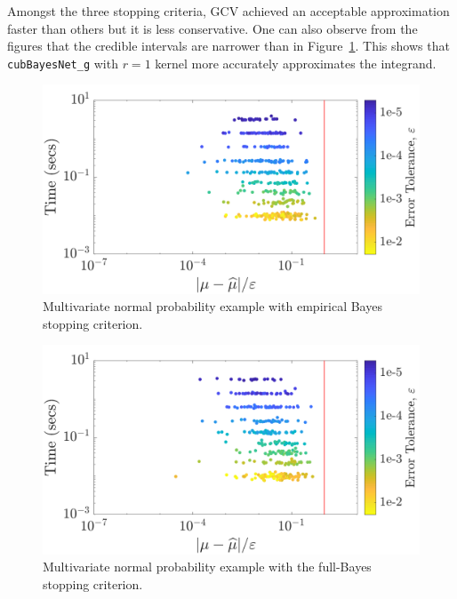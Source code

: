 \documentclass[graybox,footinfo]{svmult}
\newcommand{\code}[1]{\texttt{#1}}
\newcommand\figref{Figure~\ref}
\begin{document}
Amongst the three stopping criteria, GCV achieved an acceptable approximation faster than others but it is less conservative. 
One can also observe from the figures that the credible intervals are narrower than in \figref{fig:Sobol-mvn-guaranteed-MLE}.
This shows that \code{cubBayesNet\_g} with $r=1$ kernel more accurately approximates the integrand.

\begin{figure}
\centering
\includegraphics[width=0.95\linewidth]{"figures/Sobol/Sobol_MVN_guaranteed_time_MLE__d2_r1_2019-Sep-1"}
\caption[Sobol: MVN guaranteed: MLE]{Multivariate normal probability example with empirical Bayes stopping criterion.}
\label{fig:Sobol-mvn-guaranteed-MLE}
\end{figure}
\begin{figure}
\centering
\includegraphics[width=0.95\linewidth]{"figures/Sobol/Sobol_MVN_guaranteed_time_full__d2_r1_2019-Sep-1"}
\caption[Sobol: MVN guaranteed: Full Bayes]{Multivariate normal probability example with the full-Bayes stopping criterion.}
\label{fig:Sobol-mvn-guaranteed-FB}
\end{figure}
\end{document}
